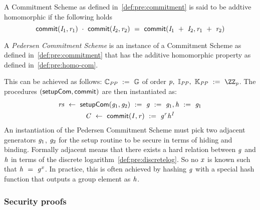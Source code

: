 \begin{definition}\label{def:pre:homo-com}
    A Commitment Scheme as defined in~\cref{def:pre:commitment} is said to be addtive homomorphic if the following holds~\cite{bunz2018bulletproofs}
    \[ \mathsf{commit}(\mathit{I}_1, \mathit{r}_1) ~\cdot~ \mathsf{commit}(\mathit{I}_2, \mathit{r}_2) ~=~ \mathsf{commit}(\mathit{I}_1 ~+~ \mathit{I}_2, \mathit{r}_1 ~+~ \mathit{r}_2) \]
\end{definition}



\begin{definition}\label{def:pre:pedersen}
    A \emph{Pedersen Commitment Scheme} is an instance of a Commitment Scheme as defined in~\cref{def:pre:commitment} that has the additive homomorphic property as defined in~\cref{def:pre:homo-com}.

This can be achieved as follows:
    $\mathbb{C}_{\mathit{PP}} ~:=~ \mathbb{G}$ of order $\varPrime \opSeperate \varInputSpace_{\varPublicParam} \opSeperate \varRandSpace_{\varPublicParam} \opAssign \cnstIntegersPrime{\varPrime}$.
    The procedures $(\mathsf{setupCom}, \mathsf{commit})$ are then instantiated as:
    \begin{gather*}
        \mathit{rs} ~\leftarrow~ \mathsf{setupCom} (\mathit{g}_1,\mathit{g}_2) ~:=~ \mathit{g} ~:=~ \mathit{g}_1, \mathit{h} ~:=~ \mathit{g}_1  \\
        \mathit{C} ~\leftarrow~ \mathsf{commit}(\mathit{I}, \mathit{r}) ~:=~ \mathit{g}^{\mathit{r}} \mathit{h}^{\mathit{I}}\\
    \end{gather*}
    An instantiation of the Pedersen Commitment Scheme must pick two adjacent generators $\mathit{g}_1$, $\mathit{g}_2$ for the setup routine to be secure in terms of hiding and binding.
    Formally adjacent means that there exists a hard relation between $\mathit{g}$ and $\mathit{h}$ in terms of the discrete logarithm~\cref{def:pre:discretelog}.
So no $\mathit{x}$ is known such that $\mathit{h} ~=~ \mathit{g}^{x}$.
    In practice, this is often achieved by hashing $\mathit{g}$ with a special hash function that outputs a group element as $\mathit{h}$.

\end{definition}

\subsubsection{Security proofs}

